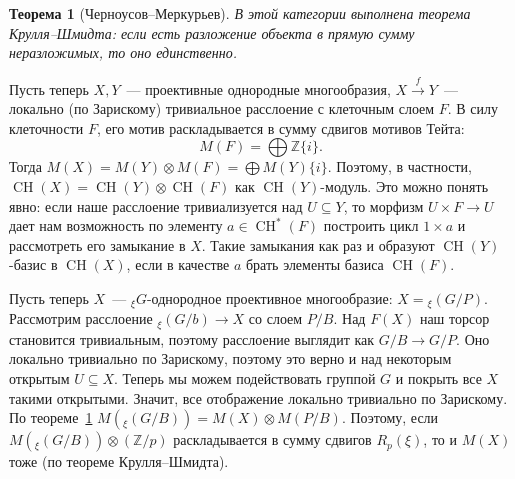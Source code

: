 \documentclass[a4paper]{article}
\DeclareMathOperator{\CH}{CH}
\newtheorem{theorem}{Теорема}[subsection]
\theoremstyle{definition}
\begin{document}
\begin{theorem}[Черноусов--Меркурьев]\label{thm:ChM}
В этой категории выполнена теорема Крулля--Шмидта:
если есть разложение объекта в прямую сумму неразложимых,
то оно единственно.
\end{theorem}
Пусть теперь $X,Y$~--- проективные однородные многообразия,
$X\xrightarrow{f} Y$~--- локально (по Зарискому) тривиальное
расслоение с клеточным слоем $F$.
В силу клеточности $F$, его мотив раскладывается в
сумму сдвигов мотивов Тейта:
\[
M(F) = \bigoplus\mathbb{Z}\{i\}.
\]
Тогда $M(X) = M(Y)\otimes M(F) = \bigoplus M(Y)\{i\}$.
Поэтому, в частности,
$\CH(X) = \CH(Y)\otimes\CH(F)$ как $\CH(Y)$-модуль.
Это можно понять явно:
если наше расслоение тривиализуется над $U\subseteq Y$,
то морфизм $U\times F \to U$ дает нам возможность
по элементу $a\in\CH^*(F)$ построить
цикл $1\times a$ и рассмотреть его замыкание в $X$.
Такие замыкания как раз и образуют $\CH(Y)$-базис в $\CH(X)$,
если в качестве $a$ брать элементы базиса $\CH(F)$.

Пусть теперь $X$~--- ${}_{\xi}G$-однородное проективное
многообразие: $X = {}_{\xi}(G/P)$.
Рассмотрим расслоение
${}_{\xi}(G/b) \to X$ со слоем $P/B$.
Над $F(X)$ наш торсор становится тривиальным,
поэтому расслоение выглядит как $G/B \to G/P$.
Оно локально тривиально по Зарискому, поэтому
это верно и над некоторым открытым $U\subseteq X$.
Теперь мы можем подействовать группой $G$ и покрыть все $X$
такими открытыми.
Значит, все отображение локально тривиально по Зарискому.
По теореме~\ref{thm:ChM} $M({}_{\xi}(G/B)) = M(X)\otimes M(P/B)$.
Поэтому, если $M({}_{\xi}(G/B))\otimes(\mathbb{Z}/p)$
раскладывается в сумму сдвигов $R_p(\xi)$, то и $M(X)$
тоже (по теореме Крулля--Шмидта).
\end{document}
